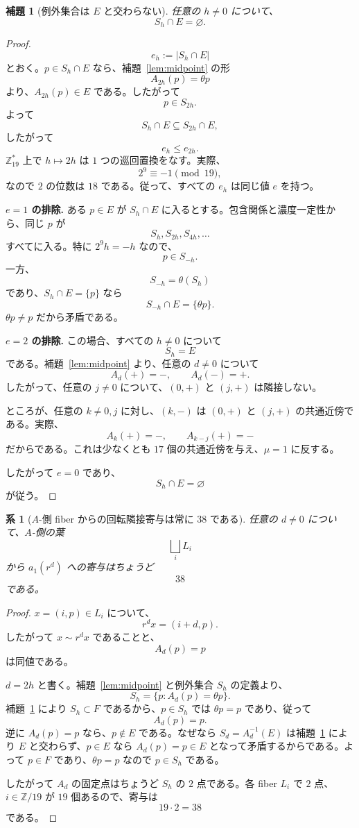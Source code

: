 \documentclass[11pt,a4paper]{article}
\theoremstyle{plain}
\newtheorem{lemma}[theorem]{補題}
\newtheorem{corollary}[theorem]{系}
\theoremstyle{definition}
\theoremstyle{remark}
\begin{document}
\begin{lemma}[例外集合は $E$ と交わらない]\label{lem:ShE}
任意の $h \neq 0$ について、
\[
S_h \cap E = \varnothing.
\]
\end{lemma}

\begin{proof}
\[
e_h := |S_h \cap E|
\]
とおく。$p \in S_h \cap E$ なら、補題~\ref{lem:midpoint} の形
\[
A_{2h}(p) = \theta p
\]
より、$A_{2h}(p) \in E$ である。したがって
\[
p \in S_{2h}.
\]
よって
\[
S_h \cap E \subseteq S_{2h} \cap E,
\]
したがって
\[
e_h \le e_{2h}.
\]
$\mathbb{Z}_{19}^{\ast}$ 上で $h \mapsto 2h$ は $1$ つの巡回置換をなす。実際、
\[
2^9 \equiv -1 \pmod{19},
\]
なので $2$ の位数は $18$ である。従って、すべての $e_h$ は同じ値 $e$ を持つ。

\medskip
\noindent\textbf{$e = 1$ の排除.}\quad
ある $p \in E$ が $S_h \cap E$ に入るとする。包含関係と濃度一定性から、同じ $p$ が
\[
S_h, S_{2h}, S_{4h}, \ldots
\]
すべてに入る。特に $2^9 h = -h$ なので、
\[
p \in S_{-h}.
\]
一方、
\[
S_{-h} = \theta(S_h)
\]
であり、$S_h \cap E = \{p\}$ なら
\[
S_{-h} \cap E = \{\theta p\}.
\]
$\theta p \neq p$ だから矛盾である。

\medskip
\noindent\textbf{$e = 2$ の排除.}\quad
この場合、すべての $h \neq 0$ について
\[
S_h = E
\]
である。補題~\ref{lem:midpoint} より、任意の $d \neq 0$ について
\[
A_d(+) = -, \qquad A_d(-) = +.
\]
したがって、任意の $j \neq 0$ について、$(0,+)$ と $(j,+)$ は隣接しない。

ところが、任意の $k \neq 0, j$ に対し、$(k,-)$ は $(0,+)$ と $(j,+)$ の共通近傍である。実際、
\[
A_k(+) = -, \qquad A_{k-j}(+) = -
\]
だからである。これは少なくとも $17$ 個の共通近傍を与え、$\mu = 1$ に反する。

したがって $e = 0$ であり、
\[
S_h \cap E = \varnothing
\]
が従う。
\end{proof}

\begin{corollary}[$A$-側 fiber からの回転隣接寄与は常に $38$ である]\label{cor:Aside}
任意の $d \neq 0$ について、$A$-側の葉
\[
\bigsqcup_i L_i
\]
から $a_1(r^d)$ への寄与はちょうど
\[
38
\]
である。
\end{corollary}

\begin{proof}
$x = (i,p) \in L_i$ について、
\[
r^d x = (i+d, p).
\]
したがって $x \sim r^d x$ であることと、
\[
A_d(p) = p
\]
は同値である。

$d = 2h$ と書く。補題~\ref{lem:midpoint} と例外集合 $S_h$ の定義より、
\[
S_h = \{p : A_d(p) = \theta p\}.
\]
補題~\ref{lem:ShE} により $S_h \subset F$ であるから、$p \in S_h$ では $\theta p = p$ であり、従って
\[
A_d(p) = p.
\]
逆に $A_d(p) = p$ なら、$p \notin E$ である。なぜなら $S_d = A_d^{-1}(E)$ は補題~\ref{lem:ShE} により $E$ と交わらず、$p \in E$ なら $A_d(p) = p \in E$ となって矛盾するからである。よって $p \in F$ であり、$\theta p = p$ なので $p \in S_h$ である。

したがって $A_d$ の固定点はちょうど $S_h$ の $2$ 点である。各 fiber $L_i$ で $2$ 点、$i \in \mathbb{Z}/19$ が $19$ 個あるので、寄与は
\[
19 \cdot 2 = 38
\]
である。
\end{proof}
\end{document}
